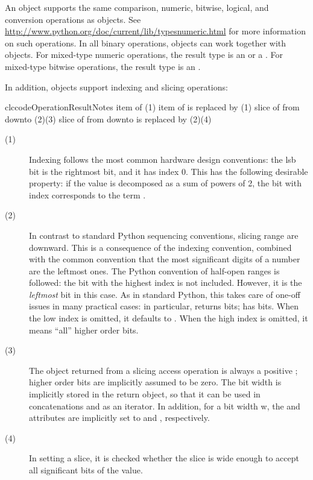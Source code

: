 An  object supports the same comparison, numeric,
bitwise, logical, and conversion operations as  objects. See
\url{http://www.python.org/doc/current/lib/typesnumeric.html} for more
information on such operations. In all binary operations,
 objects can work together with  objects.
For mixed-type numeric operations, the result type is an 
or a . For mixed-type bitwise operations, the result
type is an .

In addition,  objects support indexing and slicing
operations:

\begin{tableiii}{clc}{code}{Operation}{Result}{Notes}
	  {item  of }
	  {(1)}
	  {item  of  is replaced by } 
          {(1)}
          {slice of  from  downto } 
          {(2)(3)}
  	  {slice of  from  downto  is replaced
          by } 
          {(2)(4)}
\end{tableiii}

\begin{description}
\item[(1)] Indexing follows the most common hardware design
	  conventions: the lsb bit is the rightmost bit, and it has
	  index 0. This has the following desirable property: if the
	   value is decomposed as a sum of powers of 2,
	  the bit with index  corresponds to the term
	  .

\item[(2)] In contrast to standard Python sequencing conventions,
	  slicing range are downward. This is a consequence of the
	  indexing convention, combined with the common convention
	  that the most significant digits of a number are the
	  leftmost ones. The Python convention of half-open ranges is
	  followed: the bit with the highest index is not
	  included. However, it is the \emph{leftmost} bit in this
	  case. As in standard Python, this takes care of one-off
	  issues in many practical cases: in particular,
	   returns  bits;
	   has 
	  bits. When the low index  is omitted, it defaults
          to . When the high index  is omitted, it
          means ``all'' higher order bits.

\item[(3)] The object returned from a slicing access operation is always a
	  positive ; higher order bits are implicitly
	  assumed to be zero. The bit width is implicitly stored in
	  the return object, so that it can be used in concatenations
	  and as an iterator. In addition, for a bit width w, the
	   and  attributes are implicitly set to
	   and , respectively.  

\item[(4)] In setting a slice, it is checked whether the slice is wide
	  enough to accept all significant bits of the value.
\end{description}

